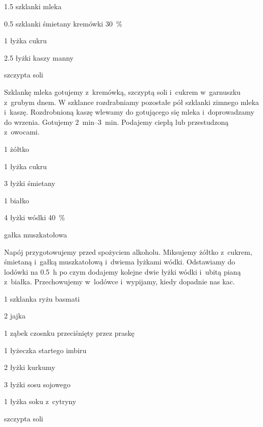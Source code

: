 \documentclass[../kucharek.tex]{subfiles}
\begin{document}

\begin{Ingred}
    \item \num{1.5} szklanki mleka
    \item \num{0.5} szklanki śmietany kremówki \qty{30}{\percent}
    \item \num{1} łyżka cukru
    \item \num{2.5} łyżki kaszy manny
    \item szczypta soli
\end{Ingred}

Szklankę mleka gotujemy z~kremówką, szczyptą soli i~cukrem w~garnuszku z~grubym
dnem. W szklance rozdrabniamy pozostałe pół szklanki zimnego mleka i~kaszę.
Rozdrobnioną kaszę wlewamy do gotującego się mleka i~doprowadzamy do wrzenia.
Gotujemy \qtyrange{2}{3}{\minute}. Podajemy ciepłą lub przestudzoną z~owocami.


\begin{Ingred}
    \item \num{1} żółtko
    \item \num{1} łyżka cukru
    \item \num{3} łyżki śmietany
    \item \num{1} białko
    \item \num{4} łyżki wódki \qty{40}{\percent}
    \item gałka muszkatołowa
\end{Ingred}

Napój przygotowujemy przed spożyciem alkoholu. Miksujemy żółtko z~cukrem,
śmietaną i~gałką muszkatołową i~dwiema łyżkami wódki. Odstawiamy do lodówki na
\qty{0.5}{\hour} po czym dodajemy kolejne dwie łyżki wódki i~ubitą pianą
z~białka. Przechowujemy w~lodówce i~wypijamy, kiedy dopadnie nas kac.


\begin{Ingred}
    \item \num{1} szklanka ryżu basmati
    \item \num{2} jajka
    \item \num{1} ząbek czosnku przeciśnięty przez praskę
    \item \num{1} łyżeczka startego imbiru
    \item \num{2} łyżki kurkumy
    \item \num{3} łyżki sosu sojowego
    \item \num{1} łyżka soku z~cytryny
    \item szczypta soli
\end{Ingred}
\end{document}
